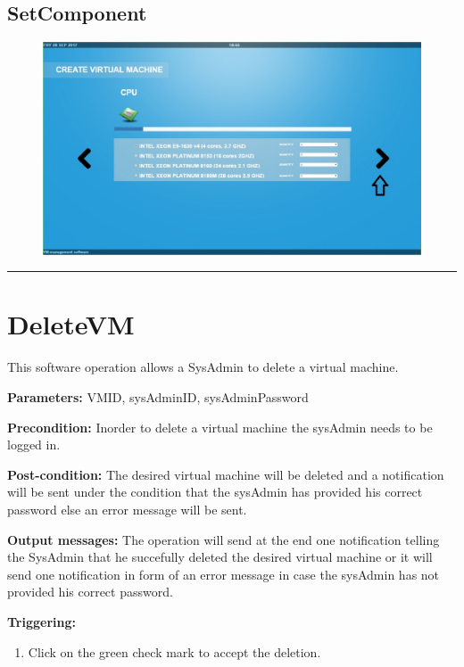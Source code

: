\subsection{SetComponent}

\begin{figure}[H]
\centering
\includegraphics[width=170mm]{images/softAvailable.eps}
\caption{\label{overflow}}
\end{figure}


\hrule
\vspace{0.5cm}







\section{DeleteVM}
\label{operation:DeleteVM}
This software operation allows a SysAdmin to delete a virtual machine. 
\begin{description}

\item \textbf{Parameters:} VMID, sysAdminID, sysAdminPassword
\item \textbf{Precondition:} Inorder to delete a virtual machine the sysAdmin
needs to be logged in.
\item \textbf{Post-condition:} The desired virtual machine will be deleted and a
notification will be sent under the condition that the sysAdmin has provided his
correct password else an error message will be sent.
\item \textbf{Output messages:} The operation will send at the end one
notification telling the SysAdmin that he succefully deleted the desired
virtual machine or it will send one notification in form of an error message in
case the sysAdmin has not provided his correct password.

\item \textbf{Triggering:}
\begin{enumerate}
\item Click on the green check mark to accept the deletion.
\end{enumerate}

 
\end{description}

